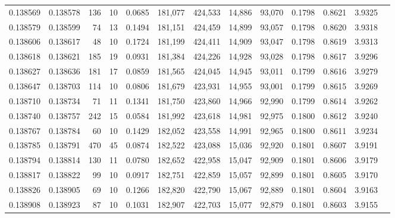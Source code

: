 \begin{tabular}{rrrrrrrrrrrrr}
0.138569 & 0.138578 &   136 &  10 &                                     0.0685 & 181,077 & 424,533 &  14,886 &  93,070 & 0.1798 & 0.8621 & 3.9325 \\
0.138579 & 0.138599 &    74 &  13 &                                     0.1494 & 181,151 & 424,459 &  14,899 &  93,057 & 0.1798 & 0.8620 & 3.9318 \\
0.138606 & 0.138617 &    48 &  10 &                                     0.1724 & 181,199 & 424,411 &  14,909 &  93,047 & 0.1798 & 0.8619 & 3.9313 \\
0.138618 & 0.138621 &   185 &  19 &                                     0.0931 & 181,384 & 424,226 &  14,928 &  93,028 & 0.1798 & 0.8617 & 3.9296 \\
0.138627 & 0.138636 &   181 &  17 &                                     0.0859 & 181,565 & 424,045 &  14,945 &  93,011 & 0.1799 & 0.8616 & 3.9279 \\
0.138647 & 0.138703 &   114 &  10 &                                     0.0806 & 181,679 & 423,931 &  14,955 &  93,001 & 0.1799 & 0.8615 & 3.9269 \\
0.138710 & 0.138734 &    71 &  11 &                                     0.1341 & 181,750 & 423,860 &  14,966 &  92,990 & 0.1799 & 0.8614 & 3.9262 \\
0.138740 & 0.138757 &   242 &  15 &                                     0.0584 & 181,992 & 423,618 &  14,981 &  92,975 & 0.1800 & 0.8612 & 3.9240 \\
0.138767 & 0.138784 &    60 &  10 &                                     0.1429 & 182,052 & 423,558 &  14,991 &  92,965 & 0.1800 & 0.8611 & 3.9234 \\
0.138785 & 0.138791 &   470 &  45 &                                     0.0874 & 182,522 & 423,088 &  15,036 &  92,920 & 0.1801 & 0.8607 & 3.9191 \\
0.138794 & 0.138814 &   130 &  11 &                                     0.0780 & 182,652 & 422,958 &  15,047 &  92,909 & 0.1801 & 0.8606 & 3.9179 \\
0.138817 & 0.138822 &    99 &  10 &                                     0.0917 & 182,751 & 422,859 &  15,057 &  92,899 & 0.1801 & 0.8605 & 3.9170 \\
0.138826 & 0.138905 &    69 &  10 &                                     0.1266 & 182,820 & 422,790 &  15,067 &  92,889 & 0.1801 & 0.8604 & 3.9163 \\
0.138908 & 0.138923 &    87 &  10 &                                     0.1031 & 182,907 & 422,703 &  15,077 &  92,879 & 0.1801 & 0.8603 & 3.9155 \\

\end{tabular}
